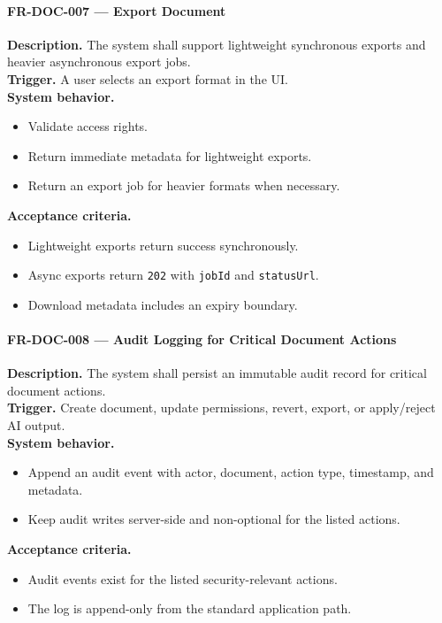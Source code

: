 \paragraph{FR-DOC-007 --- Export Document}
\textbf{Description.} The system shall support lightweight synchronous exports and heavier asynchronous export jobs.\\
\textbf{Trigger.} A user selects an export format in the UI.\\
\textbf{System behavior.}
\begin{itemize}
  \item Validate access rights.
  \item Return immediate metadata for lightweight exports.
  \item Return an export job for heavier formats when necessary.
\end{itemize}
\textbf{Acceptance criteria.}
\begin{itemize}
  \item Lightweight exports return success synchronously.
  \item Async exports return \texttt{202} with \texttt{jobId} and \texttt{statusUrl}.
  \item Download metadata includes an expiry boundary.
\end{itemize}

\paragraph{FR-DOC-008 --- Audit Logging for Critical Document Actions}
\textbf{Description.} The system shall persist an immutable audit record for critical document actions.\\
\textbf{Trigger.} Create document, update permissions, revert, export, or apply/reject AI output.\\
\textbf{System behavior.}
\begin{itemize}
  \item Append an audit event with actor, document, action type, timestamp, and metadata.
  \item Keep audit writes server-side and non-optional for the listed actions.
\end{itemize}
\textbf{Acceptance criteria.}
\begin{itemize}
  \item Audit events exist for the listed security-relevant actions.
  \item The log is append-only from the standard application path.
\end{itemize}

